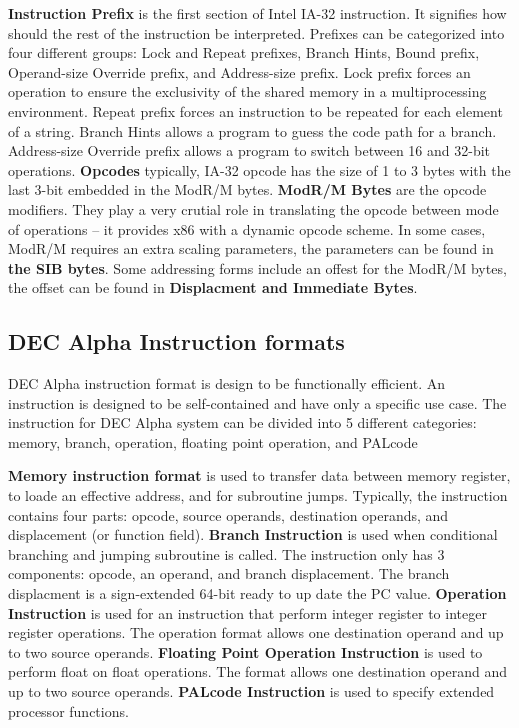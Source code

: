 \documentclass[letterpaper,10pt,titlepage]{article}
\begin{document}
\textbf{Instruction Prefix} is the first section of Intel IA-32 instruction. 
It signifies how should the rest of the instruction be interpreted. Prefixes can be 
categorized into four different groups: Lock and Repeat prefixes, Branch Hints, Bound
prefix, Operand-size Override prefix, and Address-size prefix. Lock prefix 
forces an operation to ensure the exclusivity of the shared memory in a multiprocessing 
environment. Repeat prefix forces an instruction to be repeated for each element
of a string. Branch Hints allows a program to guess the code path for a branch.
Address-size Override prefix allows a program to switch between 16 and 32-bit 
operations. \textbf{Opcodes} typically, IA-32 opcode has the size of 1 to 3 bytes with
the last 3-bit embedded in the ModR/M bytes. \textbf{ModR/M Bytes} are the 
opcode modifiers. They play a very crutial role in translating the opcode between mode
of operations -- it provides x86 with a dynamic opcode scheme. In some cases, ModR/M
requires an extra scaling parameters, the parameters can be found in \textbf{the SIB 
bytes}. Some addressing forms include an offest for the ModR/M bytes, the offset can be 
found in \textbf{Displacment and Immediate Bytes}. 

\subsection{DEC Alpha Instruction formats}
DEC Alpha instruction format is design to be functionally efficient. 
An instruction is designed to be self-contained and have only a specific use case.
The instruction for DEC Alpha system can be divided into 5 different categories:
memory, branch, operation, floating point operation, and PALcode


\textbf{Memory instruction format} is used to transfer data between memory register,
to loade an effective address, and for subroutine jumps. Typically, the instruction 
contains four parts: opcode, source operands, destination operands, and displacement
(or function field). \textbf{Branch Instruction} is used when conditional branching 
and jumping subroutine is called. The instruction only has 3 components: opcode, 
an operand, and branch displacement. The branch displacment is a sign-extended 64-bit
ready to up date the PC value. \textbf{Operation Instruction} is used for an instruction
that perform integer register to integer register operations. The operation format allows
one destination operand and up to two source operands. \textbf{Floating Point Operation
Instruction} is used to perform float on float operations. The format allows one 
destination operand and up to two source operands. \textbf{PALcode Instruction} is used
to specify extended processor functions. 
\end{document}
